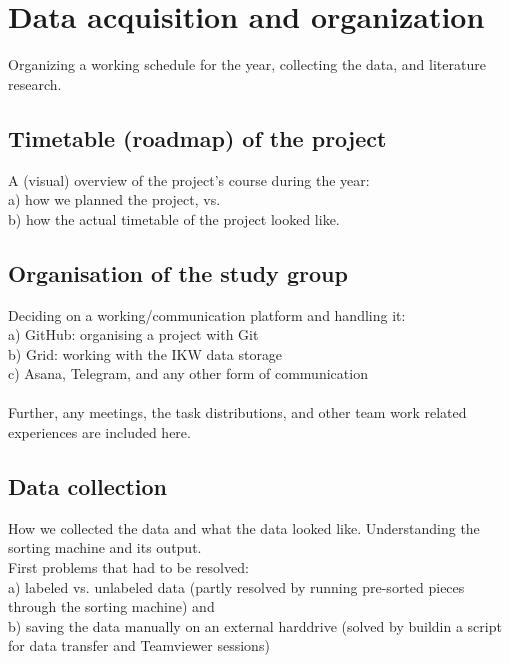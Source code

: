 \section{Data acquisition and organization}

Organizing a working schedule for the year, collecting the data, and literature research.

\subsection{Timetable (roadmap) of the project}

A (visual) overview of the project’s course during the year: \\
a) how we planned the project, vs. \\
b) how the actual timetable of the project looked like.

\subsection{Organisation of the study group}

Deciding on a working/communication platform and handling it: \\
a) GitHub: organising a project with Git \\
b) Grid: working with the IKW data storage \\
c) Asana, Telegram, and any other form of communication \\
\\
Further, any meetings, the task distributions, and other team work related experiences are included here.

\subsection{Data collection}

How we collected the data and what the data looked like. Understanding the sorting machine and its output. \\
First problems that had to be resolved: \\
a) labeled vs. unlabeled data (partly resolved by running pre-sorted pieces through the sorting machine) and \\
b) saving the data manually on an external harddrive (solved by buildin a script for data transfer and Teamviewer sessions)

